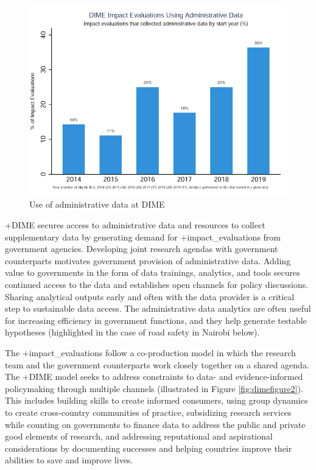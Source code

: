 \documentclass[
]{book}
\begin{document}
\begin{figure}
\includegraphics[width=1\linewidth]{./assets/dime/dimefigure1web} \caption{Use of administrative data at DIME}\label{fig:dimefigure1}
\end{figure}

+DIME\textbar{} secures access to administrative data and resources to collect supplementary data by generating demand for +impact\_evaluations\textbar{} from government agencies. Developing joint research agendas with government counterparts motivates government provision of administrative data. Adding value to governments in the form of data trainings, analytics, and tools secures continued access to the data and establishes open channels for policy discussions. Sharing analytical outputs early and often with the data provider is a critical step to sustainable data access. The administrative data analytics are often useful for increasing efficiency in government functions, and they help generate testable hypotheses (highlighted in the case of road safety in Nairobi below).

The +impact\_evaluations\textbar{} follow a co-production model in which the research team and the government counterparts work closely together on a shared agenda. The +DIME\textbar{} model seeks to address constraints to data- and evidence-informed policymaking through multiple channels (illustrated in Figure \ref{fig:dimefigure2}). This includes building skills to create informed consumers, using group dynamics to create cross-country communities of practice, subsidizing research services while counting on governments to finance data to address the public and private good elements of research, and addressing reputational and aspirational considerations by documenting successes and helping countries improve their abilities to save and improve lives.
\end{document}
